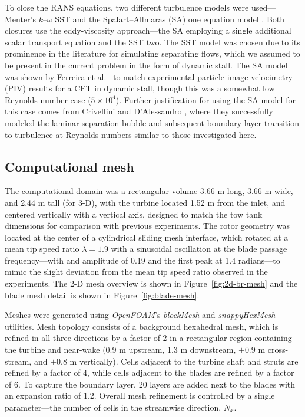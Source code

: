 \documentclass[aip,graphicx]{revtex4-1}
\begin{document}
To close the RANS equations, two different turbulence models were
used---Menter's $k$--$\omega$ SST \cite{Menter1994} and the Spalart--Allmaras
(SA) one equation model \cite{Spalart1992}. Both closures use the eddy-viscosity
approach---the SA employing a single additional scalar transport equation and
the SST two. The SST model was chosen due to its prominence in the literature
for simulating separating flows, which we assumed to be present in the current
problem in the form of dynamic stall. The SA model was shown by Ferreira
et al.~\cite{Ferreira2007} to match experimental particle image
velocimetry (PIV) results for a CFT in dynamic stall, though this was a somewhat
low Reynolds number case ($5 \times 10^4$). Further justification for using the
SA model for this case comes from Crivellini and D'Alessandro
\cite{Crivellini2014}, where they successfully modeled the laminar separation
bubble and subsequent boundary layer transition to turbulence at Reynolds
numbers similar to those investigated here.


\subsection{Computational mesh}

The computational domain was a rectangular volume 3.66 m long, 3.66 m wide, and
2.44 m tall (for 3-D), with the turbine located 1.52 m from the inlet, and
centered vertically with a vertical axis, designed to match the tow tank
dimensions for comparison with previous experiments. The rotor geometry was
located at the center of a cylindrical sliding mesh interface, which rotated at
a mean tip speed ratio $\lambda=1.9$ with a sinusoidal oscillation at the blade
passage frequency---with and amplitude of 0.19 and the first peak at 1.4
radians---to mimic the slight deviation from the mean tip speed ratio observed
in the experiments. The 2-D mesh overview is shown in
Figure~\ref{fig:2d-br-mesh} and the blade mesh detail is shown in
Figure~\ref{fig:blade-mesh}.

Meshes were generated using \textit{OpenFOAM}'s \textit{blockMesh} and
\textit{snappyHexMesh} utilities. Mesh topology consists of a background
hexahedral mesh, which is refined in all three directions by a factor of 2 in a
rectangular region containing the turbine and near-wake (0.9 m upstream, 1.3 m
downstream, $\pm 0.9$ m cross-stream, and $\pm 0.8$ m vertically). Cells
adjacent to the turbine shaft and struts are refined by a factor of 4, while
cells adjacent to the blades are refined by a factor of 6. To capture the
boundary layer, 20 layers are added next to the blades with an expansion ratio
of 1.2. Overall mesh refinement is controlled by a single parameter---the number
of cells in the streamwise direction, $N_x$.
\end{document}
